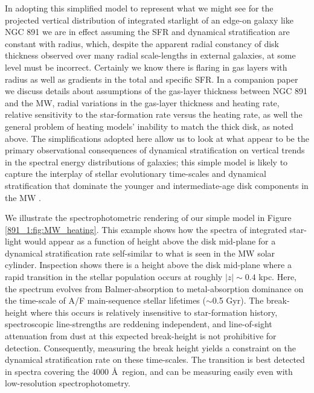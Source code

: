 In adopting this simplified model to represent what we might see for
the projected vertical distribution of integrated starlight of an
edge-on galaxy like NGC 891 we are in effect assuming the SFR and
dynamical stratification are constant with radius, which, despite the
apparent radial constancy of disk thickness observed over many radial
scale-lengths in external galaxies, at some level must be
incorrect. Certainly we know there is flaring in gas layers with
radius as well as gradients in the total and specific SFR.  In a
companion paper we discuss details about assumptions of the gas-layer
thickness between NGC 891 and the MW, radial variations in the
gas-layer thickness and heating rate, relative sensitivity to the
star-formation rate versus the heating rate, as well the general
problem of heating models' inability to match the thick disk, as noted
above. The simplifications adopted here allow us to look at what
appear to be the primary observational consequences of dynamical
stratification on vertical trends in the spectral energy distributions
of galaxies; this simple model is likely to capture the interplay of
stellar evolutionary time-scales and dynamical stratification that
dominate the younger and intermediate-age disk components in the MW
\citep{Bird13}.

We illustrate the spectrophotometric rendering of our simple model in
Figure \ref{891_1:fig:MW_heating}.  This example shows how the spectra of
integrated star-light would appear as a function of height above the
disk mid-plane for a dynamical stratification rate self-similar to what
is seen in the MW solar cylinder. Inspection shows there is a height
above the disk mid-plane where a rapid transition in the stellar
population occurs at roughly $|z| \sim 0.4$ kpc.  Here, the spectrum
evolves from Balmer-absorption to metal-absorption dominance on the
time-scale of A/F main-sequence stellar lifetimes ($\sim$0.5 Gyr). The
break-height where this occurs is relatively insensitive to
star-formation history, spectroscopic line-strengths are reddening
independent, and line-of-sight attenuation from dust at this expected
break-height is not prohibitive for detection.  Consequently,
measuring the break height yields a constraint on the dynamical
stratification rate on these time-scales. The transition is best
detected in spectra covering the 4000 \AA\ region, and can be
measuring easily even with low-resolution spectrophotometry.

